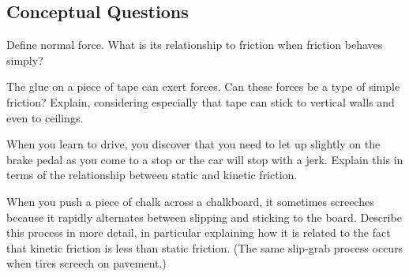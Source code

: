 \documentclass[
]{book}
\newenvironment{conceptual-questions}{}{}
\begin{document}
\hypertarget{fs-id1296538}{}
\begin{conceptual-questions}

\hypertarget{conceptual-questions-18}{%
\subsection{Conceptual Questions}\label{conceptual-questions-18}}

\hypertarget{fs-id1320466}{}
\leavevmode\hypertarget{fs-id1320468}{}%
Define normal force. What is its relationship to friction when friction
behaves simply?

\hypertarget{fs-id1748990}{}
\leavevmode\hypertarget{fs-id1748991}{}%
The glue on a piece of tape can exert forces. Can these forces be a type
of simple friction? Explain, considering especially that tape can stick
to vertical walls and even to ceilings.

\hypertarget{fs-id1425681}{}
\leavevmode\hypertarget{fs-id1425682}{}%
When you learn to drive, you discover that you need to let up slightly
on the brake pedal as you come to a stop or the car will stop with a
jerk. Explain this in terms of the relationship between static and
kinetic friction.

\hypertarget{fs-id1272970}{}
\leavevmode\hypertarget{fs-id1345599}{}%
When you push a piece of chalk across a chalkboard, it sometimes
screeches because it rapidly alternates between slipping and sticking to
the board. Describe this process in more detail, in particular
explaining how it is related to the fact that kinetic friction is less
than static friction. (The same slip-grab process occurs when tires
screech on pavement.)

\end{conceptual-questions}
\end{document}
